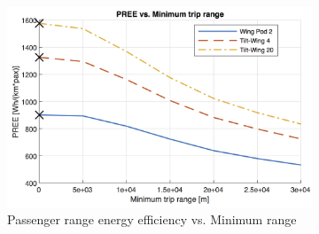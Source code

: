 \begin{figure}[h]
\begin{subfigure}[t]{0.33\textwidth}
    \includegraphics[width=\textwidth]{Figures/report_PREE.png}
    \captionsetup{justification=centering}
    \caption{Passenger range energy efficiency vs. Minimum range}
    \label{fig:sens03}
\end{subfigure}
\captionsetup{justification=centering}
\caption{}
\label{fig:sens0123}
\end{figure}


